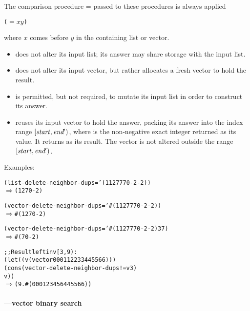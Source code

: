 The comparison procedure = passed to these procedures is always applied
\begin{alltt}
(\(=\) \(x\) \(y\))
\end{alltt}
where $x$ comes before $y$ in the containing list or vector.
%
\begin{itemize}
\item 
{} does not alter its input list; its
answer may share storage with the input list.
\item 
{} does not alter its input vector, but
rather allocates a fresh vector to hold the result.
\item
{} is permitted, but not required, to
mutate its input list in order to construct its answer.
\item
{} reuses its input vector to hold the
answer, packing its answer into the index range
\([\var{start},\var{end$'$})\), where
 is the non-negative exact integer returned as its value. It
returns  as its result. The vector is not altered outside the range
\([\var{start},\var{end$'$})\).
\end{itemize}
%
Examples:
%
\begin{alltt}
(list-delete-neighbor-dups = '(1 1 2 7 7 7 0 -2 -2))
  \(\Longrightarrow\) (1 2 7 0 -2)

(vector-delete-neighbor-dups = '#(1 1 2 7 7 7 0 -2 -2))
  \(\Longrightarrow\) #(1 2 7 0 -2)

(vector-delete-neighbor-dups = '#(1 1 2 7 7 7 0 -2 -2) 3 7)
  \(\Longrightarrow\) #(7 0 -2)

;; Result left in v[3,9):
(let ((v (vector 0 0 0 1 1 2 2 3 3 4 4 5 5 6 6)))
  (cons (vector-delete-neighbor-dups! = v 3)
        v))
   \(\Longrightarrow\) (9 . #(0 0 0 1 2 3 4 5 6 4 4 5 5 6 6))
\end{alltt}

\paragraph{---vector binary search}

\begin{protos}
\end{protos}


